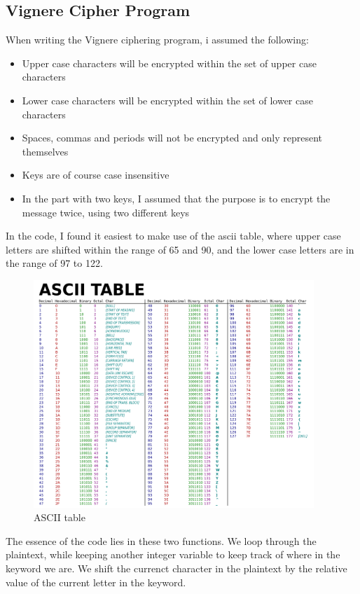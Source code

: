 \documentclass{article}
\begin{document}
\subsection{Vignere Cipher Program}

When writing the Vignere ciphering program, i assumed the following:
\begin{itemize}
\item{Upper case characters will be encrypted within the set of upper case characters}
\item{Lower case characters will be encrypted within the set of lower case characters}
\item{Spaces, commas and periods will not be encrypted and only represent themselves}
\item{Keys are of course case insensitive}
\item{In the part with two keys, I assumed that the purpose is to encrypt the message twice, using two different keys}
\end{itemize}

In the code, I found it easiest to make use of the ascii table, where upper case letters are shifted within the range of 65 and 90, and the lower case letters are in the range of 97 to 122.

\begin{figure}[H]
 \centering
  \includegraphics[width=300pt]{img/ASCII.png}
 \caption{ASCII table \cite{ASCII}}
 \end{figure}

The essence of the code lies in these two functions. We loop through the plaintext, while keeping another integer variable to keep track of where in the keyword we are. We shift the currenct character in the plaintext by the relative value of the current letter in the keyword. 
\end{document}
